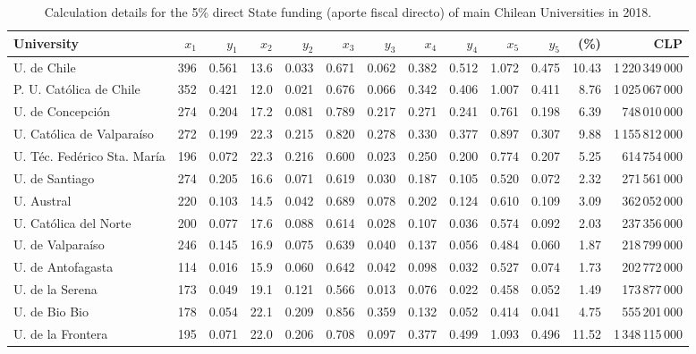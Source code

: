 \documentclass[twocolumn]{article}
\begin{document}
\begin{table}
\caption{Calculation details for the 5\% direct State funding (aporte fiscal 
directo) of main Chilean Universities in 2018.}
\label{tab:calcdetail}
\centering\footnotesize
\begin{tabular}{l rrrrrrrrrr rr}
\hline\hline
University                  &$x_1$& $y_1$ &$x_2$ & $y_2$ & $x_3$ & $y_3$ & $x_4$ & $y_4$ & $x_5$ & $y_5$ &  (\%) & CLP\\
\hline
U. de Chile                 & 396 & 0.561 & 13.6 & 0.033 & 0.671 & 0.062 & 0.382 & 0.512 & 1.072 & 0.475 & 10.43 & 1\,220\,349\,000\\
P. U. Católica de Chile     & 352 & 0.421 & 12.0 & 0.021 & 0.676 & 0.066 & 0.342 & 0.406 & 1.007 & 0.411 &  8.76 & 1\,025\,067\,000\\
U. de Concepción            & 274 & 0.204 & 17.2 & 0.081 & 0.789 & 0.217 & 0.271 & 0.241 & 0.761 & 0.198 &  6.39 &    748\,010\,000\\
U. Católica de Valparaíso   & 272 & 0.199 & 22.3 & 0.215 & 0.820 & 0.278 & 0.330 & 0.377 & 0.897 & 0.307 &  9.88 & 1\,155\,812\,000\\
U. Téc. Fedérico Sta. María & 196 & 0.072 & 22.3 & 0.216 & 0.600 & 0.023 & 0.250 & 0.200 & 0.774 & 0.207 &  5.25 &    614\,754\,000\\
U. de Santiago              & 274 & 0.205 & 16.6 & 0.071 & 0.619 & 0.030 & 0.187 & 0.105 & 0.520 & 0.072 &  2.32 &    271\,561\,000\\
U. Austral                  & 220 & 0.103 & 14.5 & 0.042 & 0.689 & 0.078 & 0.202 & 0.124 & 0.610 & 0.109 &  3.09 &    362\,052\,000\\
U. Católica del Norte       & 200 & 0.077 & 17.6 & 0.088 & 0.614 & 0.028 & 0.107 & 0.036 & 0.574 & 0.092 &  2.03 &    237\,356\,000\\
U. de Valparaíso            & 246 & 0.145 & 16.9 & 0.075 & 0.639 & 0.040 & 0.137 & 0.056 & 0.484 & 0.060 &  1.87 &    218\,799\,000\\
U. de Antofagasta           & 114 & 0.016 & 15.9 & 0.060 & 0.642 & 0.042 & 0.098 & 0.032 & 0.527 & 0.074 &  1.73 &    202\,772\,000\\
U. de la Serena             & 173 & 0.049 & 19.1 & 0.121 & 0.566 & 0.013 & 0.076 & 0.022 & 0.458 & 0.052 &  1.49 &    173\,877\,000\\
U. de Bio Bio               & 178 & 0.054 & 22.1 & 0.209 & 0.856 & 0.359 & 0.132 & 0.052 & 0.414 & 0.041 &  4.75 &    555\,201\,000\\
U. de la Frontera           & 195 & 0.071 & 22.0 & 0.206 & 0.708 & 0.097 & 0.377 & 0.499 & 1.093 & 0.496 & 11.52 & 1\,348\,115\,000\\

\end{tabular}
\end{table}
\end{document}

